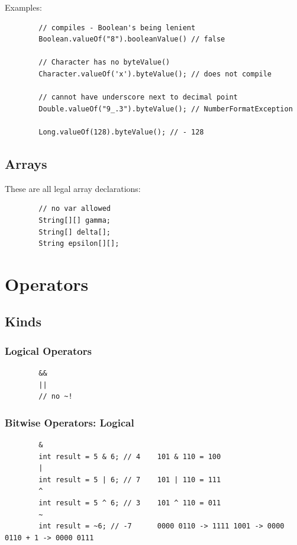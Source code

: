 \documentclass{scrartcl}
\begin{document}
    Examples:
    \begin{lstlisting}
        // compiles - Boolean's being lenient
        Boolean.valueOf("8").booleanValue() // false

        // Character has no byteValue()
        Character.valueOf('x').byteValue(); // does not compile

        // cannot have underscore next to decimal point
        Double.valueOf("9_.3").byteValue(); // NumberFormatException

        Long.valueOf(128).byteValue(); // - 128
    \end{lstlisting}

\subsection{Arrays}

    These are all legal array declarations:

    \begin{lstlisting}
        // no var allowed
        String[][] gamma;
        String[] delta[];
        String epsilon[][];
    \end{lstlisting}

\section{Operators}
\subsection{Kinds}
\subsubsection{Logical Operators}
    \begin{lstlisting}
        &&
        ||
        // no ~!
    \end{lstlisting}

\subsubsection{Bitwise Operators: Logical}
    \begin{lstlisting}
        &
        int result = 5 & 6; // 4    101 & 110 = 100
        |
        int result = 5 | 6; // 7    101 | 110 = 111
        ^
        int result = 5 ^ 6; // 3    101 ^ 110 = 011
        ~
        int result = ~6; // -7      0000 0110 -> 1111 1001 -> 0000 0110 + 1 -> 0000 0111
    \end{lstlisting}
\end{document}
